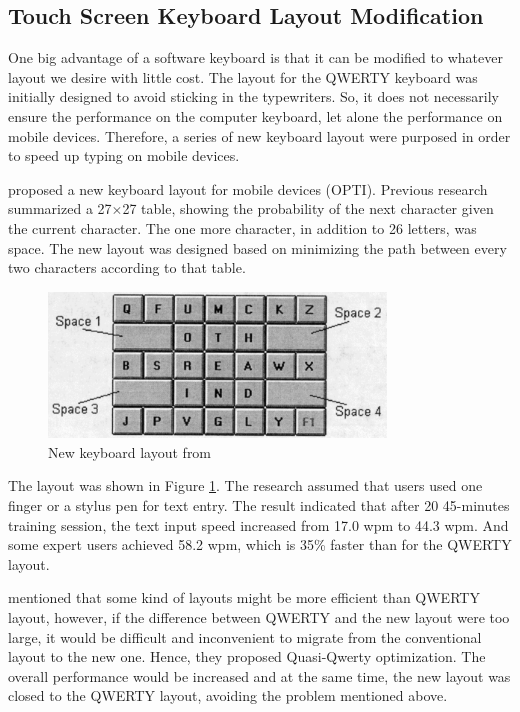 \documentclass[11pt]{article}
\begin{document}
\subsection{Touch Screen Keyboard Layout Modification}
One big advantage of a software keyboard is that it can be modified to whatever layout we desire with little cost. The layout for the QWERTY keyboard was initially designed to avoid sticking in the typewriters. So, it does not necessarily ensure the performance on the computer keyboard, let alone the performance on mobile devices. Therefore, a series of new keyboard layout were purposed in order to speed up typing on mobile devices.

\citet{10.1145/302979.302983} proposed a new keyboard layout for mobile devices (OPTI). Previous research summarized a 27$\times$27 table, showing the probability of the next character given the current character. The one more character, in addition to 26 letters, was space. The new layout was designed based on minimizing the path between every two characters according to that table.

\begin{figure}[H]
  \centering
  \includegraphics[width=0.8\textwidth]{Layout1999.png}
  \caption{New keyboard layout from \citep{10.1145/302979.302983}}
  \label{fig:layout1999}
\end{figure}

The layout was shown in Figure \ref{fig:layout1999}. The research assumed that users used one finger or a stylus pen for text entry. The result indicated that after 20 45-minutes training session, the text input speed increased from 17.0 wpm to 44.3 wpm. And some expert users achieved 58.2 wpm, which is 35\% faster than for the QWERTY layout. 

\citet{10.1145/1753326.1753367} mentioned that some kind of layouts might be more efficient than QWERTY layout, however, if the difference between QWERTY and the new layout were too large, it would be difficult and inconvenient to migrate from the conventional layout to the new one. Hence, they proposed Quasi-Qwerty optimization. The overall performance would be increased and at the same time, the new layout was closed to the QWERTY layout, avoiding the problem mentioned above. 
\end{document}
